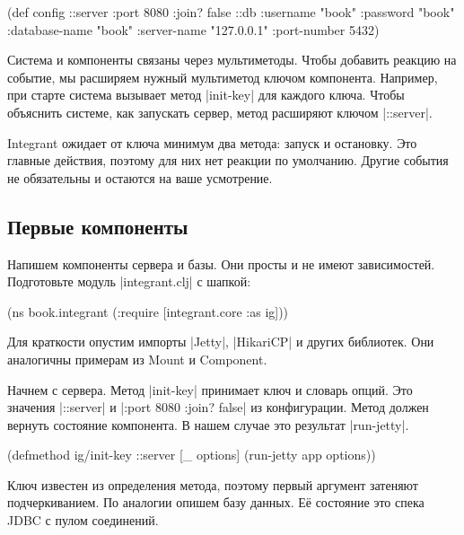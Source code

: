 \begin{english}
  \begin{clojure}
(def config
  {::server {:port 8080 :join? false}
   ::db {:username      "book"
         :password      "book"
         :database-name "book"
         :server-name   "127.0.0.1"
         :port-number   5432}})
  \end{clojure}
\end{english}

Система и компоненты связаны через мультиметоды. Чтобы добавить реакцию на
событие, мы расширяем нужный мультиметод ключом компонента. Например, при старте
система вызывает метод \spverb|init-key| для каждого ключа. Чтобы объяснить
системе, как запускать сервер, метод расширяют ключом \spverb|::server|.

Integrant ожидает от ключа минимум два метода: запуск и остановку. Это главные
действия, поэтому для них нет реакции по умолчанию. Другие события не
обязательны и остаются на ваше усмотрение.

\subsection{Первые компоненты}

Напишем компоненты сервера и базы. Они просты и не имеют
зависимостей. Подготовьте модуль \spverb|integrant.clj| с шапкой:

\begin{english}
  \begin{clojure}
(ns book.integrant
  (:require [integrant.core :as ig]))
  \end{clojure}
\end{english}

Для краткости опустим импорты \spverb|Jetty|, \spverb|HikariCP| и других
библиотек. Они аналогичны примерам из Mount и Component.

Начнем с сервера. Метод \spverb|init-key| принимает ключ и словарь опций. Это
значения \spverb|::server| и \spverb|{:port 8080 :join? false}| из
конфигурации. Метод должен вернуть состояние компонента. В нашем случае это
результат \spverb|run-jetty|.

\begin{english}
  \begin{clojure}
(defmethod ig/init-key ::server
  [_ options]
  (run-jetty app options))
  \end{clojure}
\end{english}

Ключ известен из определения метода, поэтому первый аргумент затеняют
подчеркиванием. По аналогии опишем базу данных. Е\"{е} состояние это спека JDBC
с пулом соединений.


